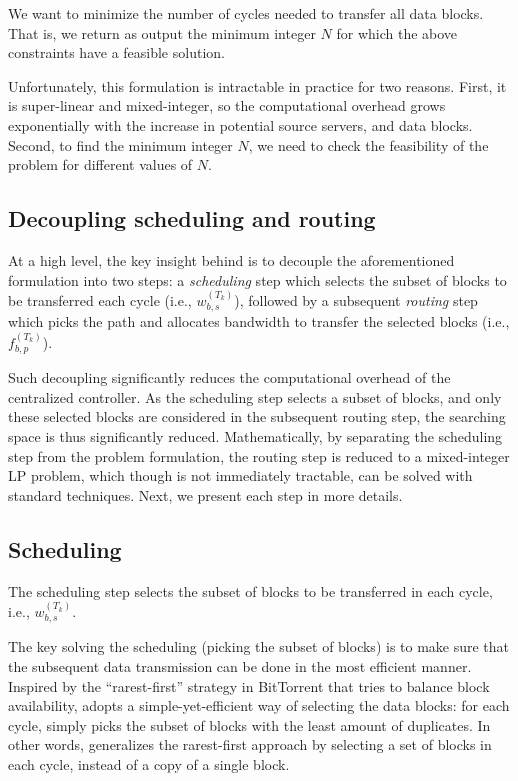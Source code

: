  We want to minimize the number of cycles needed to
transfer all data blocks. That is, we return as output the minimum
integer $N$ for which the above constraints have a feasible solution.

Unfortunately, this formulation is intractable in practice for two
reasons. First, it is super-linear and mixed-integer, so the
computational overhead grows exponentially with the increase in potential source
servers, and data blocks. Second, to find the minimum integer $N$, we
need to check the feasibility of the problem for different values of
$N$.

\subsection{Decoupling scheduling and routing}
\label{subsec:logic:separation}

At a high level, the key insight behind \name is to decouple the
aforementioned formulation into two steps: a {\em scheduling} step
which selects the subset of blocks to be transferred each cycle
(i.e., $w^{(T_k)}_{b,s}$), followed by a subsequent {\em routing}
step which picks the path and allocates bandwidth to transfer the
selected blocks (i.e.,
$f_{b,p}^{(T_k)}$).

Such decoupling significantly reduces the computational overhead of
the centralized controller. As the scheduling step selects a subset
of blocks, and only these selected blocks are considered in the
subsequent routing step, the searching space is thus significantly
reduced. Mathematically, by separating the scheduling step from the
problem formulation, the routing step is reduced to a mixed-integer
LP problem, which though is not immediately tractable, can be solved
with standard techniques. Next, we present each step in more details.

\subsection{Scheduling}
\label{subsec:logic:scheduling}

The scheduling step selects the subset of blocks to be transferred in
each cycle, i.e., $w^{(T_k)}_{b,s}$.

The key solving the scheduling (picking the subset of blocks) is to make sure that the subsequent data transmission can be done in the most efficient manner. Inspired by the ``rarest-first'' strategy in BitTorrent \cite{Cohen2003Incentives} that tries to balance block availability, \name adopts a simple-yet-efficient way of selecting the data blocks: for each cycle, \name simply picks the subset of blocks with the least amount of duplicates. In other words, \name generalizes the rarest-first approach by selecting a set of blocks in each cycle, instead of a copy of a single block.

